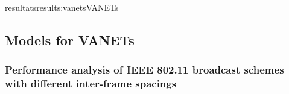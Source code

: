 \documentclass{ra2016}
\begin{document}
\begin{module}{resultats}{results:vanets}{VANETs}

%
%




\subsection{Models for VANETs}

\begin{participants}
\end{participants}

\subsubsection{Performance analysis of IEEE 802.11 broadcast schemes with different inter-frame spacings}


\end{module}
\end{document}
